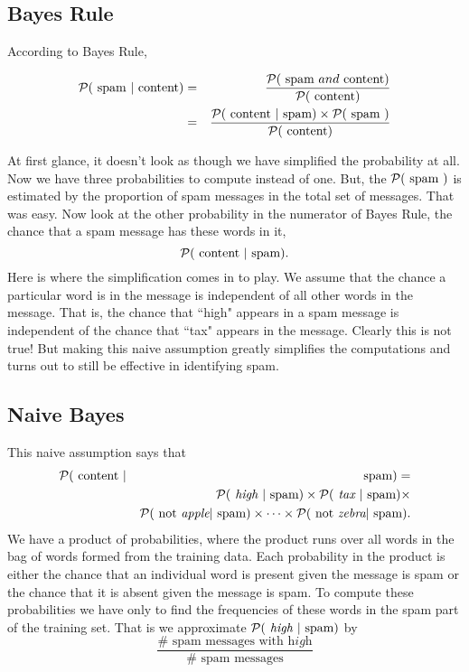 \documentclass{article}
\begin{document}
\subsection*{Bayes Rule}

According to Bayes Rule,

\begin{eqnarray*}
{\cal P}(\textrm{ spam } | \textrm{ content} ) & = &
    \frac {{\cal P}(\textrm{ spam } and  \textrm{ content} )}
        {{\cal P}(\textrm{ content} )} \\
 & = & \frac {{\cal P}(\textrm{ content }|\textrm{ spam} )\times {\cal P}(\textrm{ spam })}
   {{\cal P}(\textrm{ content} )} 
\end{eqnarray*}

At first glance, it doesn't look as though we have simplified the
probability at all. Now we have three probabilities to compute instead
of one. 
But, the ${\cal P}(\textrm{ spam })$ is estimated by the proportion
of spam messages in the total set of messages.
That was easy.
Now look at the other probability in the numerator of Bayes Rule,
the chance that a spam message has these words in it,
$${\cal P}(\textrm{ content }|\textrm{ spam} ).$$
Here is where the simplification comes in to play.
We assume that the chance a particular word is in the message
is independent of all other words in the message.
That is, the chance that ``high" appears in a spam message
is independent of the chance that ``tax" appears in the 
message.
Clearly this is not true!
But making this naive assumption greatly simplifies the 
computations and turns out to still be effective in identifying spam.

\subsection*{Naive Bayes}

This naive assumption says that 
\begin{eqnarray*}
{\cal P}(\textrm{ content } &|& \textrm{ spam} ) = \\
 & ~ & {\cal P}(\textit{ high }|\textrm{ spam} ) \times
   {\cal P}(\textit{ tax }|\textrm{ spam} ) \times \\
 &~&  {\cal P}(\textrm{ not }\textit{apple}|\textrm{ spam} ) \times \cdots \times
   {\cal P}(\textrm{ not }\textit{zebra}|\textrm{ spam}).
\end{eqnarray*}
We have a product of probabilities, 
where the product runs over all words in the bag of words formed from
the training data. 
Each probability in the product is either the chance that an individual
word is present given the message is spam or the chance that it is absent 
given the message is spam.
To compute these probabilities we have only to find the frequencies of these
words in the spam part of the training set.
That is we approximate 
${\cal P}(\textit{ high }|\textrm{ spam} )$ by 
\begin{equation}
\frac {\# \textrm{ spam messages with }\textit{high}}
   {\# \textrm{ spam messages}}
\end{equation}
\end{document}
